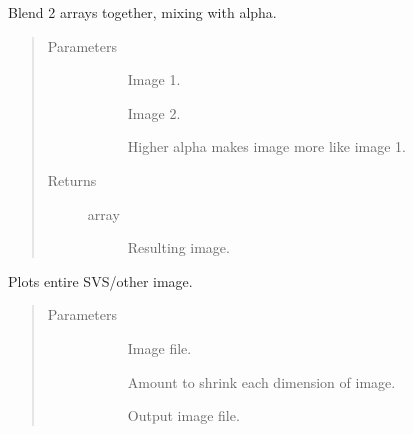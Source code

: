 \documentclass[letterpaper,10pt,english]{sphinxmanual}
\begin{document}
\begin{fulllineitems}
\label{\detokenize{index:pathflowai.visualize.blend}}
Blend 2 arrays together, mixing with alpha.
\begin{quote}\begin{description}
\item[{Parameters}] \leavevmode\begin{description}
\item[{}] \leavevmode
Image 1.

\item[{}] \leavevmode
Image 2.

\item[{}] \leavevmode
Higher alpha makes image more like image 1.

\end{description}

\item[{Returns}] \leavevmode\begin{description}
\item[{array}] \leavevmode
Resulting image.

\end{description}

\end{description}\end{quote}

\end{fulllineitems}


\begin{fulllineitems}
\label{\detokenize{index:pathflowai.visualize.plot_image_}}
Plots entire SVS/other image.
\begin{quote}\begin{description}
\item[{Parameters}] \leavevmode\begin{description}
\item[{}] \leavevmode
Image file.

\item[{}] \leavevmode
Amount to shrink each dimension of image.

\item[{}] \leavevmode
Output image file.

\end{description}

\end{description}\end{quote}

\end{fulllineitems}
\end{document}
